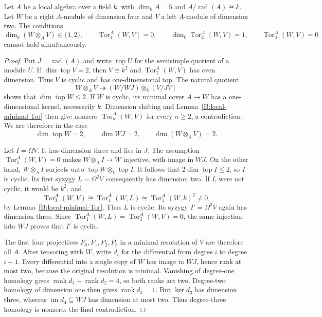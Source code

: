 \begin{lemma}
\label{B:local-five-targets}
Let $A$ be a local algebra over a field $k$, with
$\dim_k A=5$ and $A/\operatorname{rad}(A)\cong k$.
Let $W$ be a right $A$-module of dimension four and $V$ a left
$A$-module of dimension two.  The conditions
\[
 \dim_k(W\otimes_A V)\in\{1,2\},\qquad
 \operatorname{Tor}_1^A(W,V)=0,\qquad
 \dim_k\operatorname{Tor}_2^A(W,V)=1,\qquad
 \operatorname{Tor}_3^A(W,V)=0
\]
cannot hold simultaneously.
\end{lemma}

\begin{proof}
Put $J=\operatorname{rad}(A)$ and write $\operatorname{top}U$
for the semisimple quotient of a module $U$.
If $\dim\operatorname{top}V=2$, then $V\cong k^2$ and
$\operatorname{Tor}_2^A(W,V)$ has even dimension.  Thus $V$ is
cyclic and has one-dimensional top.
The natural quotient
\[
 W\otimes_A V\twoheadrightarrow
 (W/WJ)\otimes_k(V/JV)
\]
shows that $\dim\operatorname{top}W\leq2$.
If $W$ is cyclic, its minimal cover $A\to W$ has a
one-dimensional kernel, necessarily $k$.  Dimension shifting and
Lemma~\ref{B:local-minimal-Tor} then give nonzero
$\operatorname{Tor}_n^A(W,V)$ for every $n\geq2$, a
contradiction.  We are therefore in the case
\[
 \dim\operatorname{top}W=2,\qquad \dim WJ=2,
 \qquad\dim(W\otimes_A V)=2.
\]

Let $I=\Omega V$.  It has dimension three and lies in $J$.
The assumption $\operatorname{Tor}_1^A(W,V)=0$ makes
$W\otimes_A I\to W$ injective, with image in $WJ$.
On the other hand, $W\otimes_A I$ surjects onto
$\operatorname{top}W\otimes_k\operatorname{top}I$.
It follows that $2\dim\operatorname{top}I\leq2$, so $I$ is
cyclic.  Its first syzygy $L=\Omega^2V$ consequently has
dimension two.  If $L$ were not cyclic, it would be $k^2$, and
\[
 \operatorname{Tor}_3^A(W,V)
   \cong\operatorname{Tor}_1^A(W,L)
   \cong\operatorname{Tor}_1^A(W,k)^2\ne0,
\]
by Lemma~\ref{B:local-minimal-Tor}.
Thus $L$ is cyclic.  Its syzygy $I'=\Omega^3V$ again has
dimension three.  Since
$\operatorname{Tor}_1^A(W,L)=\operatorname{Tor}_3^A(W,V)=0$,
the same injection into $WJ$ proves that $I'$ is cyclic.

The first four projectives $P_0,P_1,P_2,P_3$ in a minimal
resolution of $V$ are therefore all $A$.
After tensoring with $W$, write $d_i$ for the differential from
degree $i$ to degree $i-1$.  Every differential into a single
copy of $W$ has image in $WJ$, hence rank at most two, because
the original resolution is minimal.
Vanishing of degree-one homology gives
$\operatorname{rank}d_1+\operatorname{rank}d_2=4$, so both
ranks are two.  Degree-two homology of dimension one then gives
$\operatorname{rank}d_3=1$.
But $\ker d_3$ has dimension three, whereas
$\operatorname{im}d_4\subseteq WJ$ has dimension at most two.
Thus degree-three homology is nonzero, the final contradiction.
\end{proof}
